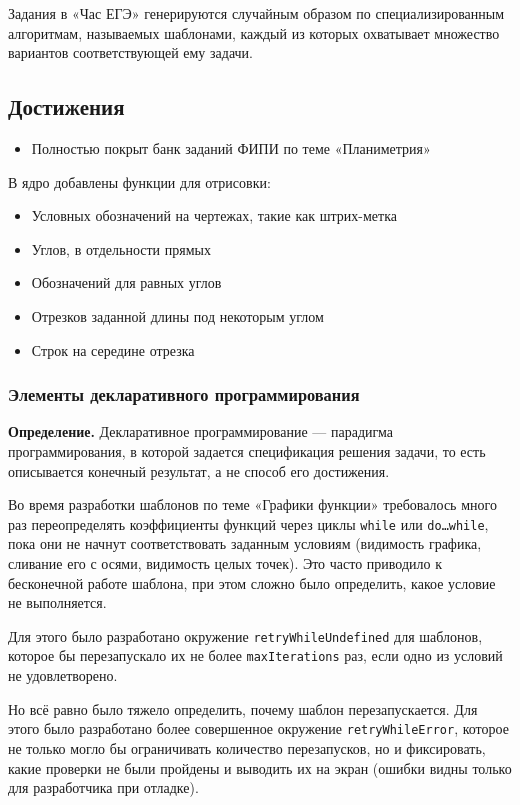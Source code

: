 \documentclass[a4paper, 12pt]{extarticle}
\begin{document}
Задания в «Час ЕГЭ» генерируются случайным образом по специализированным алгоритмам, называемых шаблонами, каждый из которых охватывает множество вариантов соответствующей ему задачи.

\subsection*{Достижения}
\begin{itemize}
	\item Полностью покрыт банк заданий ФИПИ по теме «Планиметрия»
\end{itemize}
    В ядро добавлены функции для отрисовки:
    \begin{itemize}
        \item Условных обозначений на чертежах, такие как штрих-метка
		\item Углов, в отдельности прямых
		\item Обозначений для равных углов
		\item Отрезков заданной длины под некоторым углом
		\item Строк на середине отрезка
    \end{itemize}

	\subsubsection{Элементы декларативного программирования}

	\textbf{Определение.} Декларативное программирование — парадигма программирования, в которой задается спецификация решения задачи, то есть описывается конечный результат, а не способ его достижения.
	
	Во время разработки шаблонов по теме «Графики функции» требовалось много раз переопределять коэффициенты функций через циклы 
	\texttt{while} или \texttt{do\dots while}, пока они не начнут соответствовать заданным условиям (видимость графика, сливание его с осями, видимость целых точек). Это часто приводило к бесконечной работе шаблона, при этом сложно было определить, какое условие не выполняется.
	
	Для этого было разработано окружение \texttt{retryWhileUndefined} для шаблонов, которое бы перезапускало их не более \texttt{maxIterations} раз, если одно из условий не удовлетворено. 
	
	
	Но всё равно было тяжело определить, почему шаблон перезапускается. Для этого было разработано более совершенное окружение \texttt{retryWhileError}, которое не только могло бы ограничивать количество перезапусков, но и фиксировать, какие проверки не были пройдены и выводить их на экран (ошибки видны только для разработчика при отладке).
	
\end{document}
